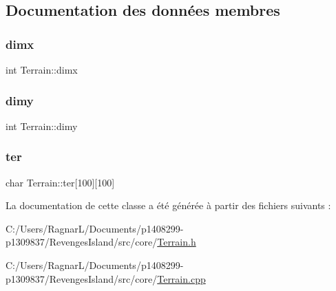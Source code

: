 \subsection{Documentation des données membres}
\mbox{\label{class_terrain_a3daf4955d95ede05eca8addab03445cd}} 
\subsubsection{\texorpdfstring{dimx}{dimx}}
{\footnotesize\ttfamily int Terrain\+::dimx\hspace{0.3cm}{\ttfamily [private]}}

\mbox{\label{class_terrain_a8ffa11e67f45e16389333431fab2110f}} 
\subsubsection{\texorpdfstring{dimy}{dimy}}
{\footnotesize\ttfamily int Terrain\+::dimy\hspace{0.3cm}{\ttfamily [private]}}

\mbox{\label{class_terrain_a52f0fcf1c339c1c5ac1fb9b3146b8d75}} 
\subsubsection{\texorpdfstring{ter}{ter}}
{\footnotesize\ttfamily char Terrain\+::ter\mbox{[}100\mbox{]}\mbox{[}100\mbox{]}\hspace{0.3cm}{\ttfamily [private]}}



La documentation de cette classe a été générée à partir des fichiers suivants \+:\begin{DoxyCompactItemize}
\item 
C\+:/\+Users/\+Ragnar\+L/\+Documents/p1408299-\/p1309837/\+Revenges\+Island/src/core/\hyperlink{_terrain_8h}{Terrain.\+h}\item 
C\+:/\+Users/\+Ragnar\+L/\+Documents/p1408299-\/p1309837/\+Revenges\+Island/src/core/\hyperlink{_terrain_8cpp}{Terrain.\+cpp}\end{DoxyCompactItemize}
